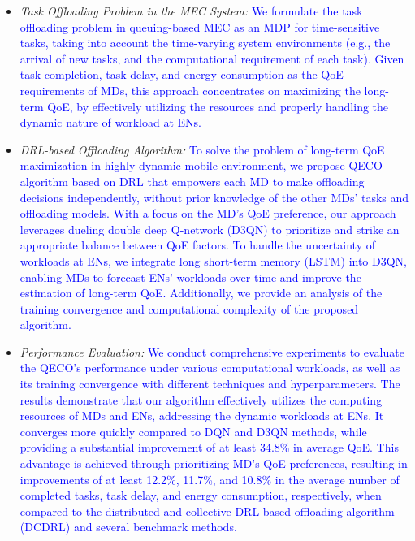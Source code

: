 \documentclass[10pt, journal,letterpaper]{IEEEtran}
\begin{document}
\begin{itemize}
	\item \textit{Task Offloading Problem in the MEC System:} \textcolor{blue}{ We formulate the task offloading problem in queuing-based MEC as an MDP for time-sensitive tasks, taking into account the time-varying system environments (e.g., the arrival of new tasks, and the computational requirement of each task). Given task completion, task delay, and energy consumption as the QoE requirements of MDs, this approach concentrates on maximizing the long-term QoE, by effectively utilizing the resources and properly handling the dynamic nature of workload at ENs.}
	
	
	\item \textit{DRL-based Offloading Algorithm:} \textcolor{blue}{To solve the problem of long-term QoE maximization in highly dynamic mobile environment, we propose QECO algorithm based on DRL that empowers each MD to make offloading decisions independently, without prior knowledge of the other MDs' tasks and offloading models. 		
		With a focus on the MD's QoE preference, our approach leverages dueling double deep Q-network (D3QN) \cite{wang2016dueling} to prioritize and strike an appropriate balance between QoE factors. To handle the uncertainty of workloads at ENs, we integrate long short-term memory (LSTM) \cite{hochreiter1997long} into D3QN, enabling MDs to forecast ENs' workloads over time and improve the estimation of long-term QoE. Additionally, we provide an analysis of the training convergence and computational complexity of the proposed algorithm.}
	
	
	\item \textit{Performance Evaluation:} \textcolor{blue}{We conduct comprehensive experiments to evaluate the QECO's performance under various computational workloads, as well as its training convergence with different techniques and hyperparameters. The results demonstrate that our algorithm effectively utilizes the computing resources of MDs and ENs, addressing the dynamic workloads at ENs. It converges more quickly compared to DQN and D3QN methods, while providing a substantial improvement of at least 34.8\% in average QoE. This advantage is achieved through prioritizing MD's QoE preferences, resulting in improvements of at least 12.2\%, 11.7\%, and 10.8\% in the average number of completed tasks, task delay, and energy consumption, respectively, when compared to the distributed and collective DRL-based offloading algorithm (DCDRL) \cite{qiu2020distributed} and several benchmark methods.}
	
	
	
\end{itemize}
\end{document}
